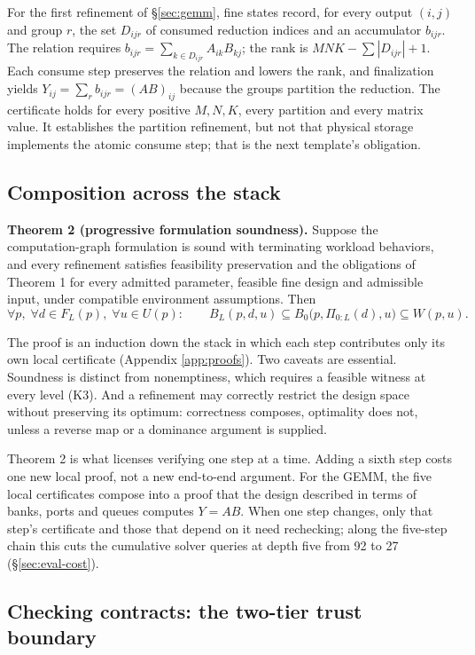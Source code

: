 \documentclass[11pt]{article}
\begin{document}
For the first refinement of §\ref{sec:gemm}, fine states record, for every output \((i,j)\) and group \(r\), the set \(D_{ijr}\) of consumed reduction indices and an accumulator \(b_{ijr}\). The relation requires \(b_{ijr}=\sum_{k\in D_{ijr}}A_{ik}B_{kj}\); the rank is \(MNK-\sum|D_{ijr}|+1\). Each consume step preserves the relation and lowers the rank, and finalization yields \(Y_{ij}=\sum_r b_{ijr}=(AB)_{ij}\) because the groups partition the reduction. The certificate holds for every positive \(M,N,K\), every partition and every matrix value. It establishes the partition refinement, but not that physical storage implements the atomic consume step; that is the next template's obligation.

\subsection{Composition across the stack}\label{sec:composition}

\textbf{Theorem 2 (progressive formulation soundness).} Suppose the computation-graph formulation is sound with terminating workload behaviors, and every refinement satisfies feasibility preservation and the obligations of Theorem 1 for every admitted parameter, feasible fine design and admissible input, under compatible environment assumptions. Then
\[
\forall p,\;\forall d\in F_L(p),\;\forall u\in U(p):\qquad B_L(p,d,u)\subseteq B_0\bigl(p,\Pi_{0:L}(d),u\bigr)\subseteq W(p,u).
\]

The proof is an induction down the stack in which each step contributes only its own local certificate (Appendix \ref{app:proofs}). Two caveats are essential. Soundness is distinct from nonemptiness, which requires a feasible witness at every level (K3). And a refinement may correctly restrict the design space without preserving its optimum: correctness composes, optimality does not, unless a reverse map or a dominance argument is supplied.

Theorem 2 is what licenses verifying one step at a time. Adding a sixth step costs one new local proof, not a new end-to-end argument. For the GEMM, the five local certificates compose into a proof that the design described in terms of banks, ports and queues computes \(Y=AB\). When one step changes, only that step's certificate and those that depend on it need rechecking; along the five-step chain this cuts the cumulative solver queries at depth five from 92 to 27 (§\ref{sec:eval-cost}).

\subsection{Checking contracts: the two-tier trust boundary}\label{sec:twotier}
\end{document}
